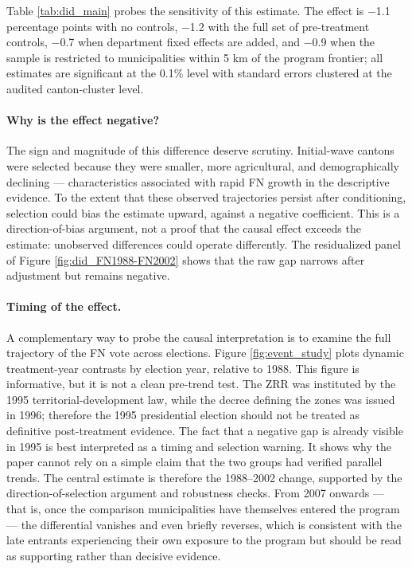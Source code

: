 

Table \ref{tab:did_main} probes the sensitivity of this estimate. The effect is $-$1.1 percentage points with no controls, $-$1.2 with the full set of pre-treatment controls, $-$0.7 when department fixed effects are added, and $-$0.9 when the sample is restricted to municipalities within 5 km of the program frontier; all estimates are significant at the 0.1\% level with standard errors clustered at the audited canton-cluster level.



\paragraph{Why is the effect negative?} The sign and magnitude of this difference deserve scrutiny. Initial-wave cantons were selected because they were smaller, more agricultural, and demographically declining --- characteristics associated with rapid FN growth in the descriptive evidence. To the extent that these observed trajectories persist after conditioning, selection could bias the estimate upward, against a negative coefficient. This is a direction-of-bias argument, not a proof that the causal effect exceeds the estimate: unobserved differences could operate differently. The residualized panel of Figure \ref{fig:did_FN1988-FN2002} shows that the raw gap narrows after adjustment but remains negative.

\paragraph{Timing of the effect.} A complementary way to probe the causal interpretation is to examine the full trajectory of the FN vote across elections. Figure \ref{fig:event_study} plots dynamic treatment-year contrasts by election year, relative to 1988. This figure is informative, but it is not a clean pre-trend test. The ZRR was instituted by the 1995 territorial-development law, while the decree defining the zones was issued in 1996; therefore the 1995 presidential election should not be treated as definitive post-treatment evidence. The fact that a negative gap is already visible in 1995 is best interpreted as a timing and selection warning. It shows why the paper cannot rely on a simple claim that the two groups had verified parallel trends. The central estimate is therefore the 1988--2002 change, supported by the direction-of-selection argument and robustness checks. From 2007 onwards --- that is, once the comparison municipalities have themselves entered the program --- the differential vanishes and even briefly reverses, which is consistent with the late entrants experiencing their own exposure to the program but should be read as supporting rather than decisive evidence.

